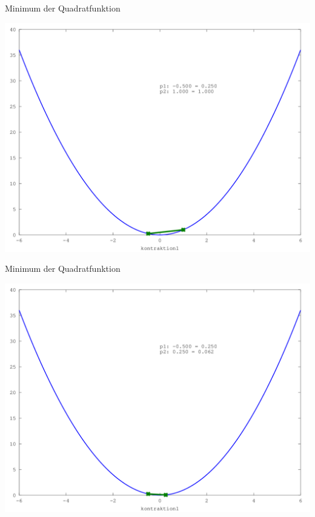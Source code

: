 \documentclass[\outputformat]{beamer}
\begin{document}
\begin{frame}{Minimum der Quadratfunktion}
	\begin{center}
		\includegraphics[height=0.75\paperheight]{../bilder/Quadrat/sinx_x004.png}
	\end{center}
\end{frame}
\begin{frame}{Minimum der Quadratfunktion}
	\begin{center}
		\includegraphics[height=0.75\paperheight]{../bilder/Quadrat/sinx_x005.png}
	\end{center}
\end{frame}
\end{document}
